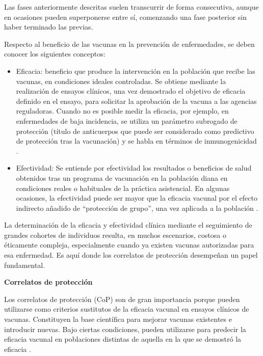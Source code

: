 Las fases anteriormente descritas suelen transcurrir de forma consecutiva, aunque en ocasiones pueden superponerse entre sí, comenzando una fase posterior sin haber terminado las previas.

Respecto al beneficio de las vacunas en la prevención de enfermedades, se deben conocer los siguientes conceptos:

\begin{itemize}
	\item Eficacia: beneficio que produce la intervención en la población que recibe las vacunas, en condiciones ideales controladas. Se obtiene mediante la realización de ensayos clínicos, una vez demostrado el objetivo de eficacia definido en el ensayo, para solicitar la aprobación de la vacuna a las agencias reguladoras. Cuando no es posible medir la eficacia, por ejemplo, en enfermedades de baja incidencia, se utiliza un parámetro subrogado de protección (título de anticuerpos que puede ser considerado como predictivo de protección tras la vacunación) y se habla en términos de inmunogenicidad \cite{aep2026}.
	
	\item Efectividad: Se entiende por efectividad los resultados o beneficios de salud obtenidos tras un programa de vacunación en la población diana en condiciones reales o habituales de la práctica asistencial. En algunas ocasiones, la efectividad puede ser mayor que la eficacia vacunal por el efecto indirecto añadido de “protección de grupo”, una vez aplicada a la población \cite{aep2026}.
	
\end{itemize}

La determinación de la eficacia y efectividad clínica mediante el seguimiento de grandes cohortes de individuos resulta, en muchos escenarios, costosa o éticamente compleja, especialmente cuando ya existen vacunas autorizadas para esa enfermedad. Es aquí donde los correlatos de protección desempeñan un papel fundamental.

\vspace{\baselineskip}
\textbf{Correlatos de protección}
\vspace{\baselineskip}

Los correlatos de protección (CoP) son de gran importancia porque pueden utilizarse como criterios sustitutos de la eficacia vacunal en ensayos clínicos de vacunas. Constituyen la base científica para mejorar vacunas existentes e introducir nuevas. Bajo ciertas condiciones, pueden utilizarse para predecir la eficacia vacunal en poblaciones distintas de aquella en la que se demostró la eficacia \cite{nauta2020}.

